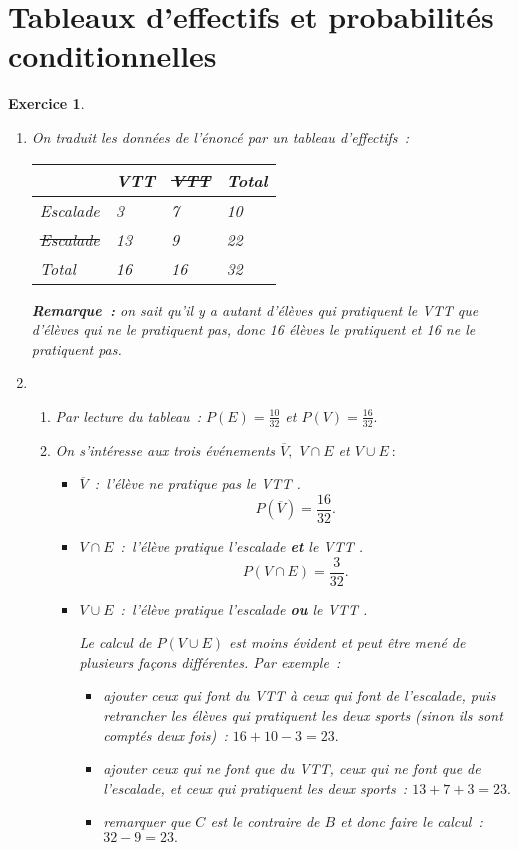 \documentclass[10pt]{article}
\newtheorem{exo}{Exercice}
\begin{document}
\section{Tableaux d'effectifs et probabilités conditionnelles}





\begin{exo}

\begin{enumerate}
\item

On traduit les données de l'énoncé par un tableau d'effectifs~:

\begin{center}
 \begin{tabular}{|m{2cm}|m{2cm}|m{2cm}|m{2cm}|}\hline
& VTT &\st{VTT}& Total \\ \hline 
Escalade& 3& 7&10 \\ \hline
\st{Escalade}& 13& 9& 22\\ \hline
Total& 16& 16& 32\\ \hline
\end{tabular}
\end{center}

\medskip

\textbf{Remarque~:} on sait qu'il y a autant  d'élèves qui pratiquent le VTT que d'élèves qui ne le pratiquent pas, donc 16 élèves le pratiquent et 16 ne le pratiquent pas.

\item \begin{enumerate}
\item Par lecture du tableau~: $P(E)=\frac{10}{32}$ et $P(V)=\frac{16}{32}.$
\item On s'intéresse aux trois événements $\overline{V},$ $V\cap E$ et $V\cup E~:$
\begin{itemize}
\item[\textbullet] $\overline{V}$~:~\og l'élève ne pratique pas le VTT \fg. \[P\left(\overline{V}\right)=\frac{16}{32}.\]
\item[\textbullet] $V\cap E$~:~\og l'élève pratique l'escalade \textbf{et} le VTT \fg.
\[P\left(V\cap E\right)=\frac{3}{32}.\]

\item[\textbullet] $V\cup E$~:~\og l'élève pratique l'escalade \textbf{ou} le VTT \fg.

Le calcul de $P\left(V\cup E\right)$ est moins évident et peut être mené de plusieurs façons différentes. Par exemple~:
\begin{itemize}
\item[$\blacktriangleright$] ajouter ceux qui font du VTT à ceux qui font de l'escalade, puis retrancher les élèves qui pratiquent les deux sports (sinon ils sont comptés deux fois)~: $16+10-3=23.$
\item[$\blacktriangleright$] ajouter ceux qui ne font que du VTT, ceux qui ne font que de l'escalade, et ceux qui pratiquent les deux sports~: $13+7+3=23.$
\item[$\blacktriangleright$] remarquer que $C$ est le contraire de $B$ et donc faire le calcul~: $32-9=23.$
\end{itemize}


\end{itemize}
\end{enumerate}
\end{enumerate}
\end{exo}
\end{document}
